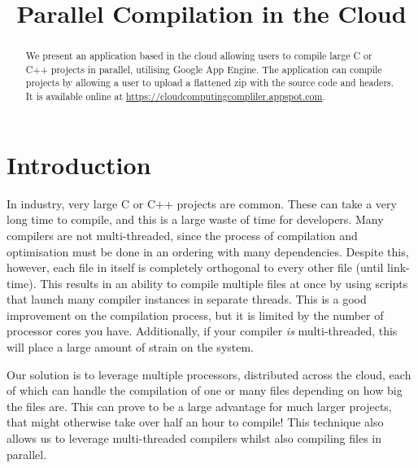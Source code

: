 \documentclass[conference]{IEEEtran}
\begin{document}
\title{Parallel Compilation in the Cloud}

\author{
\and
{}
}

\maketitle

\begin{abstract}
We present an application based in the cloud allowing users to compile large C
or C++ projects in parallel, utilising Google App Engine. The application can
compile projects by allowing a user to upload a flattened zip with the source
code and headers. It is available online at
\url{https://cloudcomputingcompliler.appspot.com}.
\end{abstract}
\section{Introduction}
In industry, very large C or C++ projects are common. These can take a very long time to compile, and this is a
large waste of time for developers. Many compilers are not multi-threaded,
since the process of compilation and optimisation must be done in an ordering with
many dependencies. Despite this, however, each file in itself is completely
orthogonal to every other file (until link-time). This results in an ability to
compile multiple files at once by using scripts that launch many compiler
instances in separate threads. This is a good improvement on the compilation
process, but it is limited by the number of processor cores you have.
Additionally, if your compiler \emph{is} multi-threaded, this will place a large
amount of strain on the system.

Our solution is to leverage multiple processors, distributed across the cloud,
each of which can handle the compilation of one or many files depending on how
big the files are. This can prove to be a large advantage for much larger
projects, that might otherwise take over half an hour to compile! This technique
also allows us to leverage multi-threaded compilers whilst also compiling files
in parallel.
\end{document}
